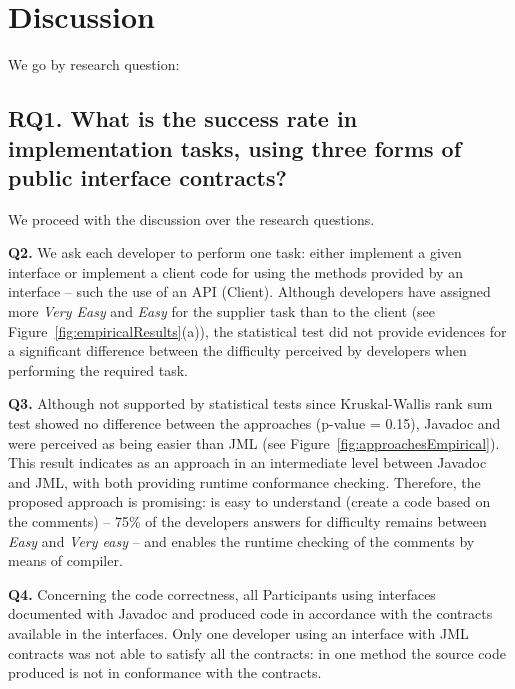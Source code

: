 \section{Discussion}
\label{discussion}

We go by research question:

\subsection{RQ1. What is the success rate in implementation tasks, using three forms of public interface contracts?}
\label{rq1}




We proceed with the discussion over the research questions.

\textbf{Q2.} We ask each developer to perform one task:
either implement a given interface or implement a client code for using the
methods provided by an interface -- such the use of an API (Client). 
Although developers have assigned more \emph{Very Easy} and \textit{Easy} for
the supplier task than to the client (see Figure~\ref{fig:empiricalResults}(a)),
the statistical test did not provide evidences for a significant difference
between the difficulty perceived by developers when performing the required
task.


\textbf{Q3.}  Although not supported by statistical tests since Kruskal-Wallis
rank sum test showed no difference between the approaches (p-value = 0.15), Javadoc and
\contractjdoc{} were perceived as being easier than JML (see Figure~\ref{fig:approachesEmpirical}).
This result indicates \contractjdoc{} as an approach in an intermediate level
between Javadoc and JML, with both providing runtime conformance checking. Therefore, the
proposed approach is promising: \contractjdoc{} is easy to understand
(create a code based on the comments) -- 75\% of the developers answers for
difficulty remains between \textit{Easy} and \textit{Very easy} -- and enables
the runtime checking of the comments by means of \contractjdocCompiler{}
compiler.

\textbf{Q4.} Concerning the code correctness, all Participants using
interfaces documented with Javadoc and \contractjdoc{} produced code
in accordance with the contracts available in the interfaces. Only one
developer using an interface with JML contracts was not able to
satisfy all the contracts: in one method the source code produced is not in
conformance with the contracts. 

